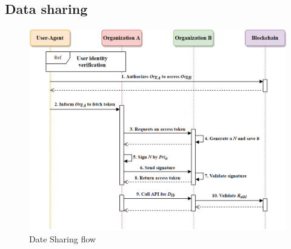     \subsection{Data sharing}
    \begin{figure}[htb]
        \centering
        \includegraphics[height=!,width=1\linewidth,keepaspectratio=true]{figures/data_sharing.png}
        \caption{{\footnotesize Date Sharing flow}}
        \label{fig:dataSharing}
    \end{figure}

    \newpage
